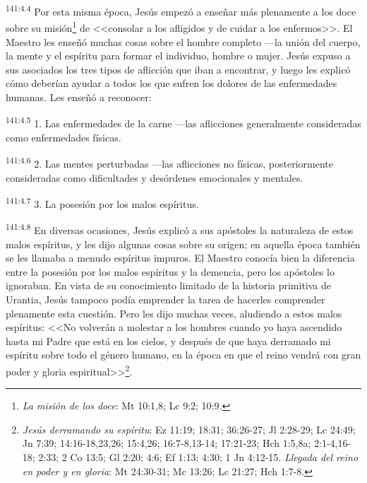 \par 
\textsuperscript{141:4.4} Por esta misma época, Jesús empezó a enseñar más plenamente a los doce sobre su misión\footnote{\textit{La misión de los doce}: Mt 10:1,8; Lc 9:2; 10:9.} de <<consolar a los afligidos y de cuidar a los enfermos>>. El Maestro les enseñó muchas cosas sobre el hombre completo ---la unión del cuerpo, la mente y el espíritu para formar el individuo, hombre o mujer. Jesús expuso a sus asociados los tres tipos de aflicción que iban a encontrar, y luego les explicó cómo deberían ayudar a todos los que sufren los dolores de las enfermedades humanas. Les enseñó a reconocer:

\par 
\textsuperscript{141:4.5} 1. Las enfermedades de la carne ---las aflicciones generalmente consideradas como enfermedades físicas.

\par 
\textsuperscript{141:4.6} 2. Las mentes perturbadas ---las aflicciones no físicas, posteriormente consideradas como dificultades y desórdenes emocionales y mentales.

\par 
\textsuperscript{141:4.7} 3. La posesión por los malos espíritus.

\par 
\textsuperscript{141:4.8} En diversas ocasiones, Jesús explicó a sus apóstoles la naturaleza de estos malos espíritus, y les dijo algunas cosas sobre su origen; en aquella época también se les llamaba a menudo espíritus impuros. El Maestro conocía bien la diferencia entre la posesión por los malos espíritus y la demencia, pero los apóstoles lo ignoraban. En vista de su conocimiento limitado de la historia primitiva de Urantia, Jesús tampoco podía emprender la tarea de hacerles comprender plenamente esta cuestión. Pero les dijo muchas veces, aludiendo a estos malos espíritus: <<No volverán a molestar a los hombres cuando yo haya ascendido hasta mi Padre que está en los cielos, y después de que haya derramado mi espíritu sobre todo el género humano, en la época en que el reino vendrá con gran poder y gloria espiritual>>\footnote{\textit{Jesús derramando su espíritu}: Ez 11:19; 18:31; 36:26-27; Jl 2:28-29; Lc 24:49; Jn 7:39; 14:16-18,23,26; 15:4,26; 16:7-8,13-14; 17:21-23; Hch 1:5,8a; 2:1-4,16-18; 2:33; 2 Co 13:5; Gl 2:20; 4:6; Ef 1:13; 4:30; 1 Jn 4:12-15. \textit{Llegada del reino en poder y en gloria}: Mt 24:30-31; Mc 13:26; Lc 21:27; Hch 1:7-8.}.

